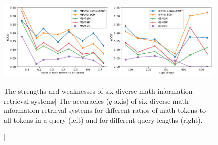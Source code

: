 \begin{figure}
\includegraphics{strengths-and-weaknesses}
\vspace{-0.8cm}
\caption
  [The strengths and weaknesses of six diverse math information retrieval systems]%
  {The accuracies ($y$-axis) of six diverse math information retrieval systems
   for different ratios of math tokens to all tokens in a query (left)
   and for different query lengths (right). \cite[Figure 8]{novotny2021ensembling}}
\label{fig:strengths-and-weaknesses}
\end{figure}